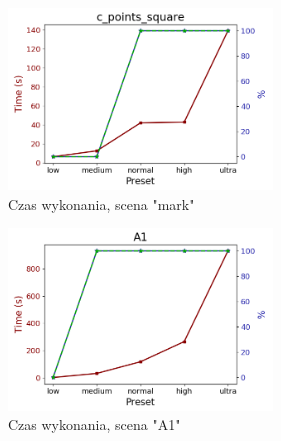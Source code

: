 \begin{figure}[h]
   \centering
   \includegraphics[width=7cm]{measure/mark.png}
   \caption{Czas wykonania, scena "mark"}
   \label {fig:measure_mark}
\end{figure}
\begin{figure}[h]
   \centering
   \includegraphics[width=7cm]{measure/A1.png}
   \caption{Czas wykonania, scena "A1"}
   \label {fig:measure_A1}
\end{figure}



